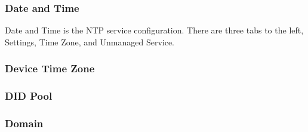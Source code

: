 \documentclass[letterpaper,10pt,english]{sphinxmanual}
\begin{document}
\subsubsection{Date and Time}
\label{\detokenize{webui:date-and-time}}\label{\detokenize{webui:id49}}
Date and Time is the NTP service configuration. There are three tabs to the left, Settings, Time Zone, and Unmanaged Service.
\begin{quote}



\end{quote}


\subsubsection{Device Time Zone}
\label{\detokenize{webui:device-time-zone}}\label{\detokenize{webui:device-timezone}}\begin{quote}

\end{quote}


\subsubsection{DID Pool}
\label{\detokenize{webui:did-pool}}\label{\detokenize{webui:id50}}\begin{quote}

\end{quote}


\subsubsection{Domain}
\label{\detokenize{webui:domain}}\label{\detokenize{webui:id51}}\begin{quote}

\end{quote}
\end{document}
